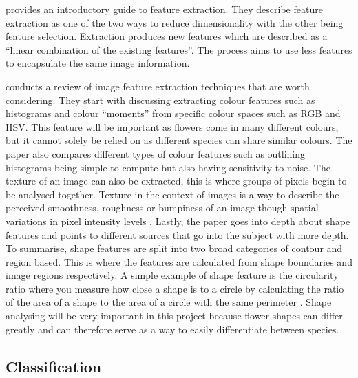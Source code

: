 \documentclass[12pt,a4paper]{report}
\begin{document}
\citet{dishaa2021} provides an introductory guide to feature extraction. They describe feature extraction 
as one of the two ways to reduce dimensionality with the other being feature selection. Extraction produces new 
features which are described as a “linear combination of the existing features”. The process aims to use less features to 
encapsulate the same image information.

\par

\citet{tian2013} conducts a review of image feature extraction techniques that are worth considering. They 
start with discussing extracting colour features such as histograms and colour “moments” from specific colour spaces 
such as RGB and HSV. This feature will be important as flowers come in many different colours, but it 
cannot solely be relied on as different species can share similar colours. The paper also compares different types of colour features such as outlining histograms being simple to 
compute but also having sensitivity to noise. The texture of an image can also be extracted, this is where 
groups of pixels begin to be analysed together. Texture in the 
context of images is a way to describe the perceived smoothness, roughness or bumpiness of an image though spatial 
variations in pixel intensity levels \citep{mathworks}. Lastly, the paper goes into depth about shape features and 
points to different sources that go into the subject with more depth. To summarise, shape features are 
split into two broad categories of contour and region based. This is where the features are calculated from shape 
boundaries and image regions respectively. A simple example of shape feature is the circularity ratio where you measure 
how close a shape is to a circle by calculating the ratio of the area of a shape to the area of a circle with the same 
perimeter \citep{mingqiang2008survey}. Shape analysing will be very important in this project because flower shapes can
differ greatly and can therefore serve as a way to easily differentiate between species.

\subsection{Classification}
\end{document}
